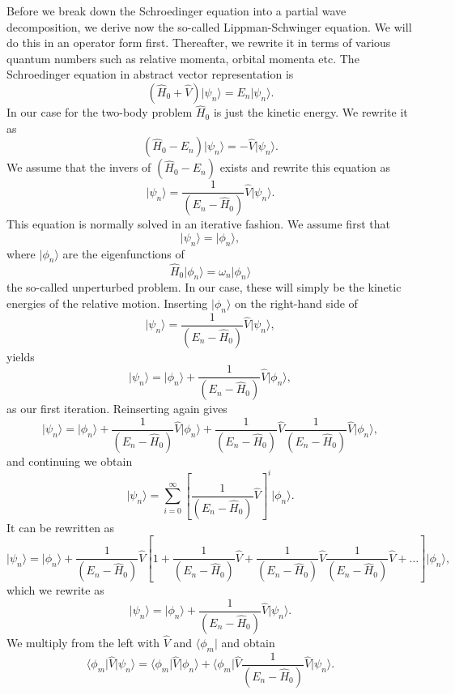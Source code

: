 \documentclass[graybox,sectrefs,envcountresetchap,open=right]{svmonodo}
\begin{document}
\noindent
Before we break down the Schroedinger equation into a partial wave decomposition, we derive now the so-called Lippman-Schwinger equation. We will do this in an operator form first.
Thereafter, we rewrite it in terms of various quantum numbers such as relative momenta, orbital momenta etc. 
The Schroedinger equation in abstract vector representation is
\[
  \left( \hat{H}_0 + \hat{V} \right) \vert \psi_n \rangle = E_n \vert\psi_n \rangle. 
\]
In our case for the two-body problem $\hat{H}_0$ is just the kinetic energy. 
We rewrite it as 
\[
\left( \hat{H}_0 -E_n \right)\vert\psi_n \rangle =-\hat{V}\vert \psi_n \rangle . 
\]
We assume that the invers of $\left( \hat{H}_0 -E_n\right)$ exists and rewrite this equation as
\[
\vert\psi_n \rangle =\frac{1}{\left( E_n -\hat{H}_0\right)}\hat{V}\vert \psi_n \rangle . 
\]
This equation is normally solved in an iterative fashion. 
We assume first that
\[
\vert\psi_n \rangle = \vert\phi_n \rangle,
\] 
where $\vert\phi_n \rangle$ are the eigenfunctions of 
\[
\hat{H}_0\vert \phi_n \rangle=\omega_n\vert \phi_n \rangle
\]
the so-called unperturbed problem. In our case, these will simply be the kinetic energies of the relative motion. 
Inserting  $\vert\phi_n \rangle$  on the right-hand side of 
\[
\vert \psi_n \rangle =\frac{1}{( E_n -\hat{H}_0)}\hat{V}\vert \psi_n \rangle,
\]
yields
\[
\vert \psi_n \rangle =\vert\phi_n \rangle+\frac{1}{\left( E_n -\hat{H}_0\right)}\hat{V}\vert \phi_n \rangle,
\]
as our first iteration. 
Reinserting again gives
\[
\vert \psi_n \rangle =\vert\phi_n \rangle+\frac{1}{\left( E_n -\hat{H}_0\right)}\hat{V}\vert \phi_n \rangle+\frac{1}{( E_n -\hat{H}_0)}\hat{V}\frac{1}{\left( E_n -\hat{H}_0\right)}\hat{V}\vert \phi_n \rangle,
\]
and continuing we obtain
\[
\vert \psi_n \rangle =\sum_{i=0}^{\infty}\left[\frac{1}{( E_n -\hat{H}_0)}\hat{V}\right]^i\vert \phi_n \rangle.
\]
It can be rewritten as 
\[
\vert \psi_n \rangle =\vert\phi_n \rangle+\frac{1}{( E_n -\hat{H}_0)}
\hat{V}\left[1+ \frac{1}{(E_n -\hat{H}_0)}\hat{V}+\frac{1}{(E_n -\hat{H}_0)}\hat{V}\frac{1}{(E_n -\hat{H}_0)}\hat{V}+\dots\right]\vert \phi_n \rangle,
\]
which we rewrite as 
\[
\vert \psi_n \rangle =\vert\phi_n \rangle+\frac{1}{(E_n -\hat{H}_0)}\hat{V}\vert \psi_n \rangle.
\]
We multiply from the left with $\hat{V}$ and $\langle \phi_m \vert$ and obtain
\[
\langle \phi_m \vert\hat{V}\vert \psi_n \rangle =\langle \phi_m \vert\hat{V}\vert\phi_n \rangle+\langle \phi_m \vert\hat{V}\frac{1}{(E_n -\hat{H}_0)}\hat{V}\vert \psi_n \rangle.
\]
\end{document}
